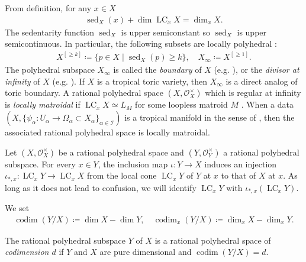 \documentclass[a4paper,dvipdfmx,reqno,12pt]{amsart}
\theoremstyle{definition}
\newcommand{\deq}{\coloneqq}
\newcommand{\opn}[1]{\operatorname{#1}}
\numberwithin{equation}{section}
\begin{document}
From definition, for any $x\in X$
\begin{align}
\opn{sed}_X(x)+\dim \opn{LC}_x X=\dim_x X.
\end{align}
The sedentarity function
$\opn{sed}_X$ is upper semiconstant
\cite[Definition 7.1.11]{mikhalkin2018tropical} so 
$\opn{sed}_X$ is upper semicontinuous.
In particular, the following subsets are
locally polyhedral
\cite[Proposition 7.1.12]{mikhalkin2018tropical}: 
\begin{align}
X^{[\geq k]}\deq \{p\in X\mid \opn{sed}_X(p)\geq k\},
\quad 
X_{\infty}\deq X^{[\geq 1]}.
\end{align}
The polyhedral subspace $X_{\infty}$ is called
the \emph{boundary} of $X$ (e.g. \cite{demedrano2023chern}),
or the \emph{divisor at infinity} of $X$
(e.g. \cite[Definition 7.2.9]{mikhalkin2018tropical}).
If $X$ is a
tropical toric variety, then $X_{\infty}$ is a
direct analog of toric boundary.
A rational polyhedral space $(X,\mathcal{O}_X^{\times})$
which is regular at infinity is \emph{locally matroidal}
if $\opn{LC}_x X\simeq L_M$ for some loopless matroid $M$
\cite[]{MR4637248}. When a data
$(X,\{\psi_\alpha \colon U_{\alpha} \to 
\Omega_{\alpha}\subset X_{\alpha}\}_{\alpha \in \mathcal{I}})$
is a tropical manifold in the sense of 
\cite[Definition 2.3]{demedrano2023chern},
then the associated rational polyhedral space
is locally matroidal.

Let $(X,\mathcal{O}_X^{\times})$ be a rational
polyhedral space and $(Y,\mathcal{O}_Y^{\times})$
a rational polyhedral subspace.
For every $x\in Y$, 
the inclusion map $\iota\colon Y\to X$ induces
an injection 
$\iota_{*,x}\colon \opn{LC}_x Y\to \opn{LC}_x X$
from the local cone $\opn{LC}_x Y$ of $Y$ at $x$ to 
that of $X$ at $x$.
As long as it does not lead to confusion, we will identify
$\opn{LC}_x Y$ with $\iota_{*,x}(\opn{LC}_x Y)$.

We set 
\begin{align}
\opn{codim}(Y/X)\deq \dim X -\dim Y,\quad 
\opn{codim}_x(Y/X)\deq \dim_x X -\dim_x Y.
\end{align}

The rational polyhedral subspace $Y$ of $X$ is
a rational polyhedral space of
\emph{codimension $d$} if $Y$ and $X$ are pure dimensional
and $\opn{codim}(Y/X)=d$.
\end{document}
